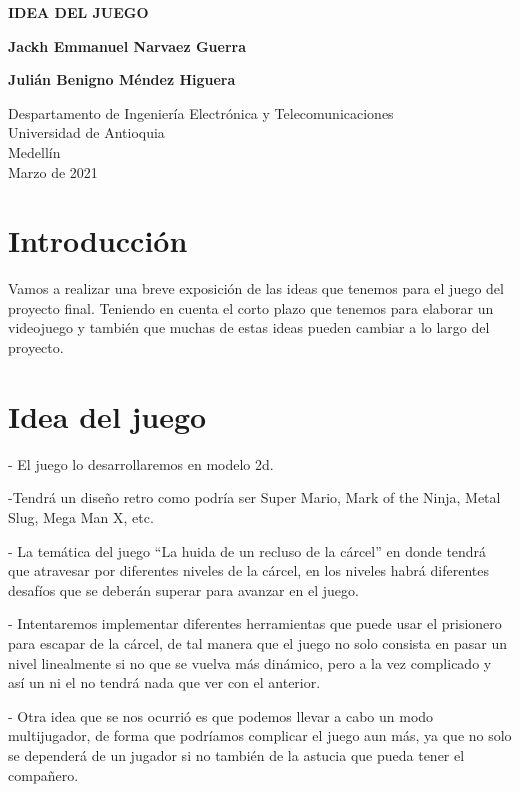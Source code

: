 \documentclass{article}
\begin{document}
\begin{titlepage}
    \begin{center}
        \vspace*{1cm}
            
        \Huge
        \textbf{IDEA DEL JUEGO}
            
        \vspace{0.5cm}
        \LARGE
        
            
        \vspace{1.5cm}
            
        \textbf{Jackh Emmanuel Narvaez Guerra}
        
        \textbf{Julián Benigno Méndez Higuera} 
         
        \vfill
            
        \vspace{0.8cm}
            
        \Large
        Despartamento de Ingeniería Electrónica y Telecomunicaciones\\
        Universidad de Antioquia\\
        Medellín\\
        Marzo de 2021
            
    \end{center}
\end{titlepage}

\tableofcontents
\newpage
\section{Introducción}\label{intro}
Vamos a realizar una breve exposición de las ideas que tenemos para el juego del proyecto final. Teniendo en cuenta el corto plazo que tenemos para elaborar un videojuego y también que muchas de estas ideas pueden cambiar a lo largo del proyecto.

\section{Idea del juego} \label{contenido}
- El juego lo desarrollaremos en modelo 2d.

-Tendrá un diseño retro como podría ser Super Mario, Mark of the Ninja, Metal Slug, Mega Man X, etc.

- La temática del juego “La huida de un recluso de la cárcel” en donde tendrá que atravesar por diferentes niveles de la cárcel, en los niveles habrá diferentes desafíos que se deberán superar para avanzar en el juego.

- Intentaremos implementar diferentes herramientas que puede usar el prisionero para escapar de la cárcel, de tal manera que el juego no solo consista en pasar un nivel linealmente si no que se vuelva más dinámico, pero a la vez complicado y así un ni el no tendrá nada que ver con el anterior.

- Otra idea que se nos ocurrió es que podemos llevar a cabo un modo multijugador, de forma que podríamos complicar el juego aun más, ya que no solo se dependerá de un jugador si no también de la astucia que pueda tener el compañero.
\end{document}
